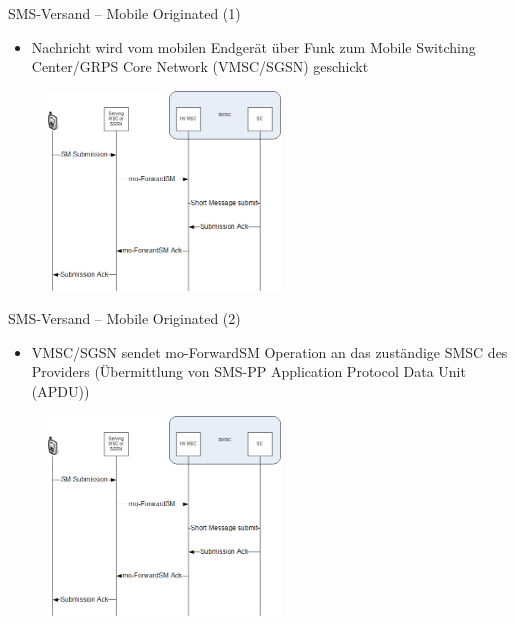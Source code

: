 \documentclass{beamer}
\begin{document}
\begin{frame}{SMS-Versand -- Mobile Originated (1)}

	\begin{itemize}
		\item Nachricht wird vom mobilen Endgerät über Funk zum Mobile Switching 
			Center/GRPS Core Network (VMSC/SGSN) geschickt
	\end{itemize}
	\begin{figure}[htm]
		\includegraphics[width=0.55\textwidth]{img/mo-forward-sm-1.png}
	\end{figure}	
\end{frame}

\begin{frame}{SMS-Versand -- Mobile Originated (2)}

	\begin{itemize}
		\item VMSC/SGSN sendet mo-ForwardSM Operation an das zuständige SMSC 
			des Providers (Übermittlung von SMS-PP Application Protocol Data Unit (APDU))
	\end{itemize}
	\begin{figure}[htm]
		\includegraphics[width=0.55\textwidth]{img/mo-forward-sm-2.png}
	\end{figure}	
\end{frame}
\end{document}
